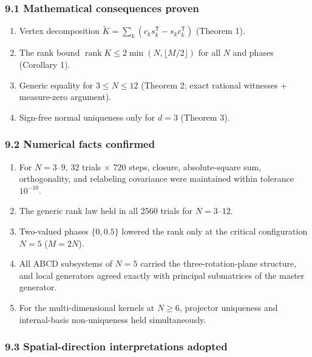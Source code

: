 \documentclass[
  a4paper,
]{article}
\providecommand{\tightlist}{%
  \setlength{\itemsep}{0pt}\setlength{\parskip}{0pt}}
\begin{document}
\subsubsection{9.1 Mathematical consequences
proven}\label{mathematical-consequences-proven}

\begin{enumerate}
\def\labelenumi{\arabic{enumi}.}
\tightlist
\item
  Vertex decomposition
  \(\widetilde K=\sum_k(c_ks_k^{\mathsf T}-s_kc_k^{\mathsf T})\)
  (Theorem 1).
\item
  The rank bound \(\operatorname{rank}K\le2\min(N,\lfloor M/2\rfloor)\)
  for all \(N\) and phases (Corollary 1).
\item
  Generic equality for \(3\le N\le12\) (Theorem 2; exact rational
  witnesses + measure-zero argument).
\item
  Sign-free normal uniqueness only for \(d=3\) (Theorem 3).
\end{enumerate}

\subsubsection{9.2 Numerical facts
confirmed}\label{numerical-facts-confirmed}

\begin{enumerate}
\def\labelenumi{\arabic{enumi}.}
\tightlist
\item
  For \(N=3\)--\(9\), 32 trials × 720 steps, closure, absolute-square
  sum, orthogonality, and relabeling covariance were maintained within
  tolerance \(10^{-10}\).
\item
  The generic rank law held in all 2560 trials for \(N=3\)--\(12\).
\item
  Two-valued phases \(\{0,0.5\}\) lowered the rank only at the critical
  configuration \(N=5\) (\(M=2N\)).
\item
  All ABCD subsystems of \(N=5\) carried the three-rotation-plane
  structure, and local generators agreed exactly with principal
  submatrices of the master generator.
\item
  For the multi-dimensional kernels at \(N\ge6\), projector uniqueness
  and internal-basis non-uniqueness held simultaneously.
\end{enumerate}

\subsubsection{9.3 Spatial-direction interpretations
adopted}\label{spatial-direction-interpretations-adopted}
\end{document}
